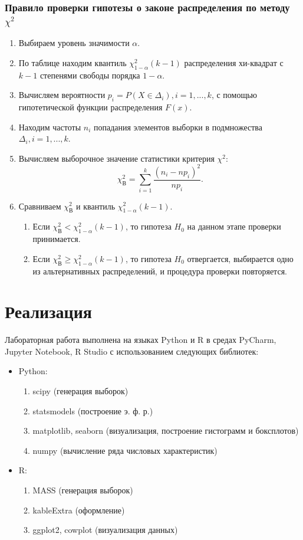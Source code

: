 \documentclass[a4paper]{article}
\begin{document}
\subsubsection*{Правило проверки гипотезы о законе распределения по методу $\chi^2$}
\begin{enumerate}
    \item Выбираем уровень значимости $\alpha$.
    \item По таблице \cite[с. 572-573]{book1} находим квантиль $\chi_{1-\alpha}^2(k-1)$ распределения хи-квадрат с $k-1$ степенями свободы порядка $1-\alpha$.
    \item Вычисляем вероятности $p_i=P(X\in\Delta_i), i = 1,...,k$, с помощью гипотетической функции распределения $F(x)$.
    \item Находим частоты $n_i$ попадания элементов выборки в подмножества $\Delta_i,i=1,...,k$.
    \item Вычисляем выборочное значение статистики критерия $\chi^2$:
        \begin{equation*}
            \chi^2_{\text{В}}=\sum_{i=1}^k\frac{(n_i-np_i)^2}{np_i}.
        \end{equation*}
    \item Сравниваем $\chi^2_{\text{В}}$ и квантиль $\chi_{1-\alpha}^2(k-1)$.
        \begin{enumerate}
            \item Если $\chi^2_{\text{В}}<\chi_{1-\alpha}^2(k-1)$, то гипотеза $H_0$ на данном этапе проверки принимается.
            \item Если $\chi^2_{\text{В}}\geq\chi_{1-\alpha}^2(k-1)$, то гипотеза $H_0$ отвергается, выбирается одно из альтернативных распределений, и процедура проверки повторяется.

        \end{enumerate}
\end{enumerate}
\section{Реализация}
Лабораторная работа выполнена на языках Python и R в средах PyCharm, Jupyter Notebook, R Studio с использованием следующих библиотек:
\begin{itemize}
    \item Python:
    \begin{enumerate}
        \item scipy (генерация выборок)
        \item statsmodels (построение э. ф. р.)
        \item matplotlib, seaborn (визуализация, построение гистограмм и боксплотов)
        \item numpy (вычисление ряда числовых характеристик)
    \end{enumerate}
    \item R:
    \begin{enumerate}
        \item MASS (генерация выборок)
        \item kableExtra (оформление)
        \item ggplot2, cowplot (визуализация данных)
        
\end{enumerate}
\end{itemize}
\end{document}
